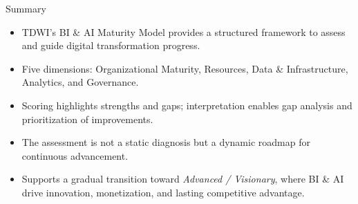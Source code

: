 \documentclass[aspectratio=169, table]{beamer}
\begin{document}
\begin{frame}{Summary}
	\vspace{20pt}
	
	\begin{itemize}
		\item TDWI’s BI \& AI Maturity Model provides a structured framework to assess and guide digital transformation progress.  
		\item Five dimensions: Organizational Maturity, Resources, Data \& Infrastructure, Analytics, and Governance.  
		\item Scoring highlights strengths and gaps; interpretation enables gap analysis and prioritization of improvements.  
		\item The assessment is not a static diagnosis but a dynamic roadmap for continuous advancement.  
		\item Supports a gradual transition toward \textit{Advanced / Visionary}, where BI \& AI drive innovation, monetization, and lasting competitive advantage.  
	\end{itemize}
	
\end{frame}
\end{document}
